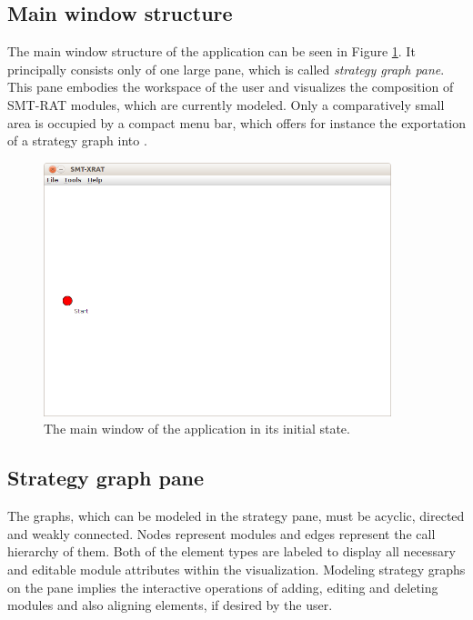 \subsection{Main window structure}
\label{sec:main_window_structure_of_smt-xrat}
The main window structure of the \smtxrat application can be seen 
in Figure \ref{fig:smt-xrat_main_window}. It principally consists 
only of one large pane, which is called \emph{strategy graph pane}. 
This pane embodies the workspace of the user and visualizes the 
composition of SMT-RAT modules, which are currently modeled. Only a
comparatively small area is occupied by a compact menu bar, which 
offers for instance the exportation of a strategy graph into \smtrat.
\begin{figure}[ht]
  \begin{center}
    \includegraphics[width=0.9\textwidth]{graphics/smt-xrat_main_window.png}
  \end{center}
  \caption{The main window of the \smtxrat application in its initial state.}
  \label{fig:smt-xrat_main_window}
\end{figure}

\subsection{Strategy graph pane}
\label{sec:the_strategy_graph_pane}
The graphs, which can be modeled in the strategy pane, must be acyclic, directed and weakly 
connected. Nodes represent \smtrat modules and edges represent the call 
hierarchy of them. Both of the element types are labeled to display all 
necessary and editable module attributes within the visualization.
Modeling strategy graphs on the pane implies the interactive operations 
of adding, editing and deleting modules and also aligning elements, 
if desired by the user.

